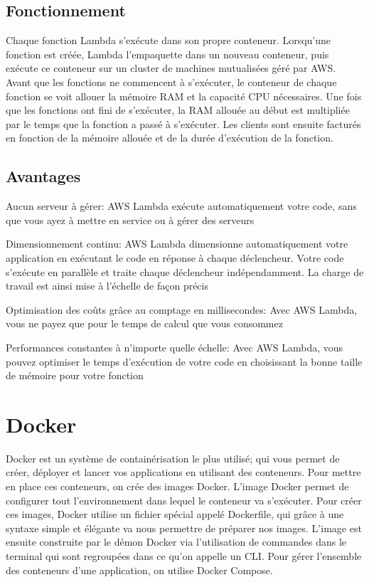 \subsection{Fonctionnement}
Chaque fonction Lambda s'exécute dans son propre conteneur. Lorsqu'une fonction est créée, Lambda l'empaquette dans un nouveau conteneur, puis exécute ce conteneur sur un cluster de machines mutualisées géré par AWS. Avant que les fonctions ne commencent à s'exécuter, le conteneur de chaque fonction se voit allouer la mémoire RAM et la capacité CPU nécessaires. Une fois que les fonctions ont fini de s'exécuter, la RAM allouée au début est multipliée par le temps que la fonction a passé à s'exécuter. Les clients sont ensuite facturés en fonction de la mémoire allouée et de la durée d'exécution de la fonction.
\subsection{Avantages}
\begin{list}{•}
	\item Aucun serveur à gérer:
	AWS Lambda exécute automatiquement votre code, sans que vous ayez à mettre en service ou à gérer des
	serveurs
	\item Dimensionnement continu:
	AWS Lambda dimensionne automatiquement votre application en exécutant le code en réponse à chaque
	déclencheur. Votre code s’exécute en parallèle et traite chaque déclencheur indépendamment. La charge de
	travail est ainsi mise à l’échelle de façon précis
	\item Optimisation des coûts grâce au comptage en millisecondes:
	Avec AWS Lambda, vous ne payez que pour le temps de calcul que vous consommez
	\item Performances constantes à n’importe quelle échelle:
	Avec AWS Lambda, vous pouvez optimiser le temps d’exécution de votre code en choisissant la bonne taille de mémoire pour
	votre fonction
\end{list}


\section{Docker}
Docker est un système de containérisation le plus utilisé; qui vous permet de créer, déployer et lancer vos applications en utilisant des conteneurs.
Pour mettre en place ces conteneurs, on crée des images Docker. L’image Docker permet de configurer tout l’environnement dans lequel le conteneur va s'exécuter. 
Pour créer ces images, Docker utilise un fichier spécial appelé Dockerfile, qui grâce à une syntaxe simple et élégante va nous permettre de préparer nos images.
L’image est ensuite construite par le démon Docker via l’utilisation de commandes dans le terminal qui sont regroupées dans ce qu’on appelle un CLI.
Pour gérer l’ensemble des conteneurs d’une application, on utilise Docker Compose.

